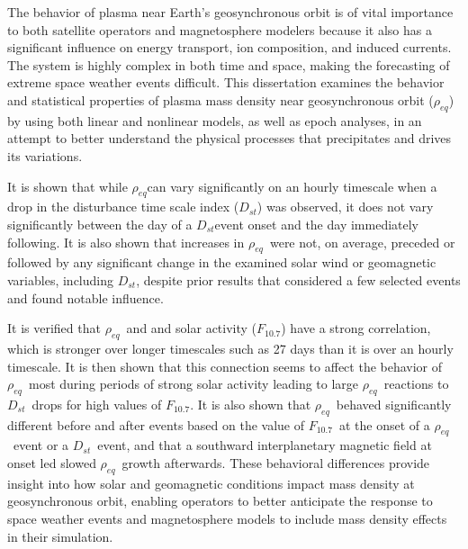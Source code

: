 \documentclass[11 pt]{GMUDissertation}
\newcommand{\req}{\ensuremath{\rho_{eq}}} %
\newcommand{\dst}{\ensuremath{D_{st}}} %
\newcommand{\f}{\ensuremath{F_{10.7}}} %
\begin{document}

\tableofcontents

\listoftables

\listoffigures







\abstractpage


The behavior of plasma near Earth's geosynchronous orbit is of vital importance to both satellite operators and magnetosphere modelers because it also has a significant influence on energy transport, ion composition, and induced currents. The system is highly complex in both time and space, making the forecasting of extreme space weather events difficult. This dissertation examines the behavior and statistical properties of plasma mass density near geosynchronous orbit (\req) by using both linear and nonlinear models, as well as epoch analyses, in an attempt to better understand the physical processes that precipitates and drives its variations. 

It is shown that while \req can vary significantly on an hourly timescale when a drop in the disturbance time scale index (\dst) was observed, it does not vary significantly between the day of a \dst event onset and the day immediately following. It is also shown that increases in \req\ were not, on average, preceded or followed by any significant change in the examined solar wind or geomagnetic variables, including \dst, despite prior results that considered a few selected events and found notable influence. 

%

\abstractmultiplepage


It is verified that \req\ and and solar activity (\f) have a strong correlation, which is stronger over longer timescales such as 27 days than it is over an hourly timescale. It is then shown that this connection seems to affect the behavior of \req\ most during periods of strong solar activity leading to large \req\ reactions to \dst\ drops for high values of \f.  It is also shown that \req\ behaved significantly different before and after events based on the value of \f\ at the onset of a \req\ event or a \dst\ event, and that a southward interplanetary magnetic field at onset led slowed \req\ growth afterwards. These behavioral differences provide insight into how solar and geomagnetic conditions impact mass density at geosynchronous orbit, enabling operators to better anticipate the response to space weather events and magnetosphere models to include mass density effects in their simulation.
\end{document}
